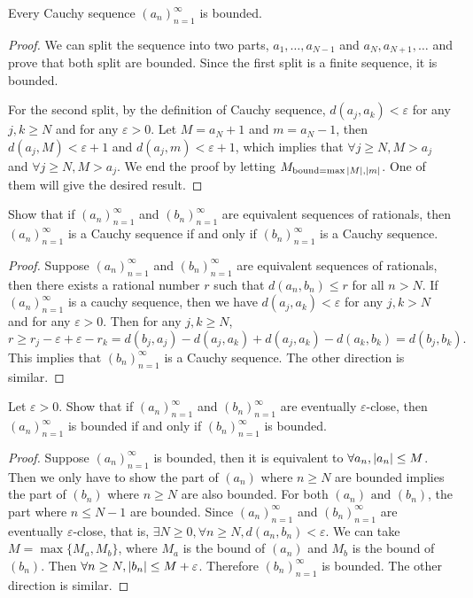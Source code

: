 \begin{exercise}
  Every Cauchy sequence $(a_n)_{n=1}^\infty$ is bounded.
\end{exercise}
\begin{proof}
  We can split the sequence into two parts, $a_1, \dots, a_{N-1}$ and $a_N, a_{N+1}, \dots$ and prove that both split are bounded.
  Since the first split is a finite sequence, it is bounded. 

  For the second split, by the definition of Cauchy sequence, $d(a_j, a_k) < \varepsilon$ for any $j, k \geq N$ and for any $\varepsilon > 0$.
  Let $M = a_N + 1$ and $m = a_N - 1$, then $d(a_j, M) < \varepsilon + 1$ and $d(a_j, m) < \varepsilon + 1$,
  which implies that $\forall j \geq N, M > a_j$ and $\forall j \geq N, M > a_j$. We end the proof by letting $M_{\text{bound} = \max{\abs{M}, \abs{m}}}$.
  One of them will give the desired result.
\end{proof}


\begin{exercise}
  Show that if $(a_n)_{n=1}^\infty$ and $(b_n)_{n=1}^\infty$ are equivalent sequences of rationals,
  then $(a_n)_{n=1}^\infty$ is a Cauchy sequence if and only if $(b_n)_{n=1}^\infty$ is a Cauchy sequence.
\end{exercise}
\begin{proof}
  Suppose $(a_n)_{n=1}^\infty$ and $(b_n)_{n=1}^\infty$ are equivalent sequences of rationals,
  then there exists a rational number $r$ such that $d(a_n, b_n) \leq r$ for all $n > N$.
  If $(a_n)_{n=1}^\infty$ is a cauchy sequence, then we have $d(a_j, a_k) < \varepsilon$ for any $j, k > N$ and for any $\varepsilon > 0$.
  Then for any $j, k \geq N$, $$r \geq r_j - \varepsilon + \varepsilon - r_k = d(b_j, a_j) - d(a_j, a_k) + d(a_j, a_k)- d(a_k, b_k) = d(b_j, b_k).$$
  This implies that $(b_n)_{n=1}^\infty$ is a Cauchy sequence. The other direction is similar.
\end{proof}



\begin{exercise}
  Let $\varepsilon > 0$. Show that if $(a_n)_{n=1}^\infty$ and $(b_n)_{n=1}^\infty$ are eventually $\varepsilon$-close,
  then $(a_n)_{n=1}^\infty$ is bounded if and only if $(b_n)_{n=1}^\infty$ is bounded.
\end{exercise}
\begin{proof}
  Suppose $(a_n)_{n=1}^\infty$ is bounded, then it is equivalent to $\forall a_n, \abs{a_n} \leq M$. 
  Then we only have to show the part of $(a_n)$ where $n \geq N$ are bounded implies the part of $(b_n)$ where $n \geq N$ are also bounded.
  For both $(a_n) \text{\ and\ } (b_n)$, the part where $n \leq N-1$ are bounded.
  Since $(a_n)_{n=1}^\infty$ and $(b_n)_{n=1}^\infty$ are eventually $\varepsilon$-close, that is, $\exists N \geq 0, \forall n \geq N, d(a_n, b_n) < \varepsilon$.
  We can take $M = \max\{M_a, M_b\}$, where $M_a$ is the bound of $(a_n)$ and $M_b$ is the bound of $(b_n)$.
  Then $\forall n \geq N, \abs{b_n} \leq M + \varepsilon$. Therefore $(b_n)_{n=1}^\infty$ is bounded. The other direction is similar.
\end{proof}



